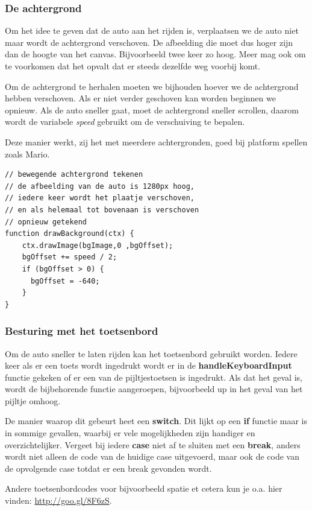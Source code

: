 \documentclass[a4paper]{report}
\begin{document}
\subsubsection*{De achtergrond}
Om het idee te geven dat de auto aan het rijden is, verplaatsen we de auto niet maar wordt de achtergrond verschoven. De afbeelding die moet dus hoger zijn dan de hoogte van het canvas. Bijvoorbeeld twee keer zo hoog. Meer mag ook om te voorkomen dat het opvalt dat er steeds dezelfde weg voorbij komt. 

Om de achtergrond te herhalen moeten we bijhouden hoever we de achtergrond hebben verschoven. Als er niet verder geschoven kan worden beginnen we opnieuw. Als de auto sneller gaat, moet de achtergrond sneller scrollen, daarom wordt de variabele \emph{speed} gebruikt om de verschuiving te bepalen.

Deze manier werkt, zij het met meerdere achtergronden, goed bij platform spellen zoals Mario.

\begin{lstlisting}[numbers=none]
// bewegende achtergrond tekenen
// de afbeelding van de auto is 1280px hoog,
// iedere keer wordt het plaatje verschoven,
// en als helemaal tot bovenaan is verschoven 
// opnieuw getekend
function drawBackground(ctx) {
	ctx.drawImage(bgImage,0 ,bgOffset);
    bgOffset += speed / 2;
    if (bgOffset > 0) {
	  bgOffset = -640;
    }
}
\end{lstlisting}

\subsubsection*{Besturing met het toetsenbord}
Om de auto sneller te laten rijden kan het toetsenbord gebruikt worden. Iedere keer als er een toets wordt ingedrukt wordt er in de \textbf{handleKeyboardInput} functie gekeken of er een van de pijltjestoetsen is ingedrukt. Als dat het geval is, wordt de bijbehorende functie aangeroepen, bijvoorbeeld up in het geval van het pijltje omhoog.

De manier waarop dit gebeurt heet een \textbf{switch}. Dit lijkt op een \textbf{if} functie maar is in sommige gevallen, waarbij er vele mogelijkheden zijn handiger en overzichtelijker. Vergeet bij iedere \textbf{case} niet af te sluiten met een \textbf{break}, anders wordt niet alleen de code van de huidige case uitgevoerd, maar ook de code van de opvolgende case totdat er een break gevonden wordt.

Andere toetsenbordcodes voor bijvoorbeeld spatie et cetera kun je o.a. hier vinden: \url{http://goo.gl/8F6zS}.
\end{document}

